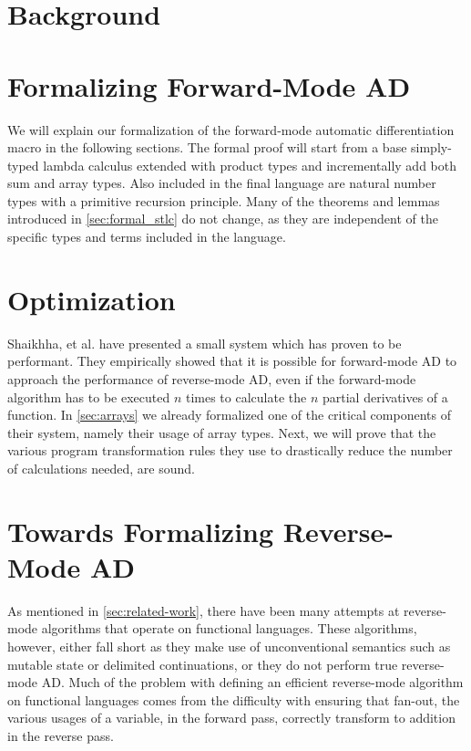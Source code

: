 \documentclass[11pt, final]{article}
\begin{document}

\newpage


\newpage

\setcounter{page}{3}
\tableofcontents
\newpage



\section{Background}





% 

\section{Formalizing Forward-Mode AD}\label{sec:forward}
  We will explain our formalization of the forward-mode automatic differentiation macro in the following sections.
  The formal proof will start from a base simply-typed lambda calculus extended with product types and incrementally add both sum and array types.
  Also included in the final language are natural number types with a primitive recursion principle.
  Many of the theorems and lemmas introduced in \cref{sec:formal_stlc} do not change, as they are independent of the specific types and terms included in the language.
  
  
  
\section{Optimization}
  Shaikhha, et al. have presented a small system which has proven to be performant\cite{Shaikha2019}.
  They empirically showed that it is possible for forward-mode AD to approach the performance of reverse-mode AD, even if the forward-mode algorithm has to be executed $n$ times to calculate the $n$ partial derivatives of a function.
  In \cref{sec:arrays} we already formalized one of the critical components of their system, namely their usage of array types.
  Next, we will prove that the various program transformation rules they use to drastically reduce the number of calculations needed, are sound.
  
\section{Towards Formalizing Reverse-Mode AD}
  As mentioned in \cref{sec:related-work}, there have been many attempts at reverse-mode algorithms that operate on functional languages.
  These algorithms, however, either fall short as they make use of unconventional semantics such as mutable state or delimited continuations, or they do not perform true reverse-mode AD.
  Much of the problem with defining an efficient reverse-mode algorithm on functional languages comes from the difficulty with ensuring that fan-out, the various usages of a variable, in the forward pass, correctly transform to addition in the reverse pass.
\end{document}
